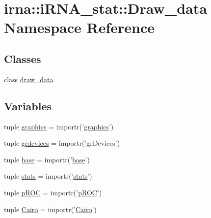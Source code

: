 \hypertarget{namespaceirna_1_1iRNA__stat_1_1Draw__data}{
\section{irna\-:\-:i\-R\-N\-A\-\_\-stat\-:\-:\-Draw\-\_\-data \-Namespace \-Reference}
\label{namespaceirna_1_1iRNA__stat_1_1Draw__data}
}
\subsection*{\-Classes}
\begin{DoxyCompactItemize}
\item 
class \hyperlink{classirna_1_1iRNA__stat_1_1Draw__data_1_1draw__data}{draw\-\_\-data}
\end{DoxyCompactItemize}
\subsection*{\-Variables}
\begin{DoxyCompactItemize}
\item 
tuple \hyperlink{namespaceirna_1_1iRNA__stat_1_1Draw__data_a99616724d338476cea101489f2a9a42c}{graphics} = importr('\hyperlink{namespaceirna_1_1iRNA__stat_1_1Draw__data_a99616724d338476cea101489f2a9a42c}{graphics}')
\item 
tuple \hyperlink{namespaceirna_1_1iRNA__stat_1_1Draw__data_a1df1981d191b6cafaddc7b81285f6e2f}{grdevices} = importr('gr\-Devices')
\item 
tuple \hyperlink{namespaceirna_1_1iRNA__stat_1_1Draw__data_acedcfd6ea92994e69ece645a9ed2537b}{base} = importr('\hyperlink{namespaceirna_1_1iRNA__stat_1_1Draw__data_acedcfd6ea92994e69ece645a9ed2537b}{base}')
\item 
tuple \hyperlink{namespaceirna_1_1iRNA__stat_1_1Draw__data_a6bb98bb35332ca13e7328cb82458e58b}{stats} = importr('\hyperlink{namespaceirna_1_1iRNA__stat_1_1Draw__data_a6bb98bb35332ca13e7328cb82458e58b}{stats}')
\item 
tuple \hyperlink{namespaceirna_1_1iRNA__stat_1_1Draw__data_ae0090f589c9502cf4ad628761a28aa81}{p\-R\-O\-C} = importr('\hyperlink{namespaceirna_1_1iRNA__stat_1_1Draw__data_ae0090f589c9502cf4ad628761a28aa81}{p\-R\-O\-C}')
\item 
tuple \hyperlink{namespaceirna_1_1iRNA__stat_1_1Draw__data_a6ab40480025057ff930f9248fa8ef6cb}{\-Cairo} = importr('\hyperlink{namespaceirna_1_1iRNA__stat_1_1Draw__data_a6ab40480025057ff930f9248fa8ef6cb}{\-Cairo}')
\end{DoxyCompactItemize}


